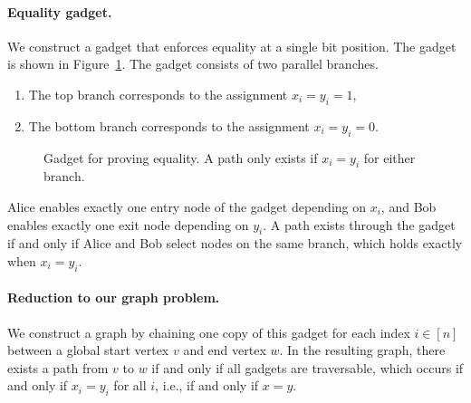 \documentclass{article}
\begin{document}
\paragraph{Equality gadget.}
We construct a gadget that enforces equality at a single bit position. The gadget is shown in Figure~\ref{fig:equality_gadget}. The gadget consists of two parallel branches.

\begin{enumerate}
    \item The top branch corresponds to the assignment $x_i = y_i = 1$, 
    \item The bottom branch corresponds to the assignment $x_i = y_i = 0$. 
\end{enumerate}
 

\begin{figure}[h]
\centering
{}
\caption{Gadget for proving equality. A path only exists if $x_i = y_i$ for either branch.}
\label{fig:equality_gadget}
\end{figure}


Alice enables exactly one entry node of the gadget depending on $x_i$, and Bob enables exactly one exit node depending on $y_i$. A path exists through the gadget if and only if Alice and Bob select nodes on the same branch, which holds exactly when $x_i = y_i$.\\

\paragraph{Reduction to our graph problem.}
We construct a graph by chaining one copy of this gadget for each index $i \in [n]$ between a global start vertex $v$ and end vertex $w$. In the resulting graph, there exists a path from $v$ to $w$ if and only if all gadgets are traversable, which occurs if and only if $x_i = y_i$ for all $i$, i.e., if and only if $x = y$.
\end{document}
